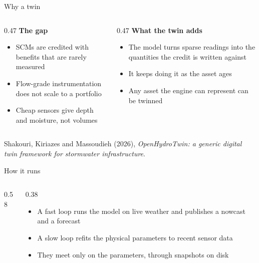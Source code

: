 \documentclass[aspectratio=169, 10pt]{beamer}
\begin{document}
\begin{frame}{Why a twin}
  \begin{columns}[T,onlytextwidth]
    \begin{column}{0.47\textwidth}
      \textbf{The gap}
      \begin{itemize}\setlength\itemsep{4pt}
        \item SCMs are credited with benefits that are rarely measured
        \item Flow-grade instrumentation does not scale to a portfolio
        \item Cheap sensors give depth and moisture, not \alert{volumes}
      \end{itemize}
    \end{column}
    \begin{column}{0.47\textwidth}
      \textbf{What the twin adds}
      \begin{itemize}\setlength\itemsep{4pt}
        \item The model turns sparse readings into the quantities the credit
              is written against
        \item It keeps doing it \alert{as the asset ages}
        \item Any asset the engine can represent can be twinned
      \end{itemize}
    \end{column}
  \end{columns}
  \vspace{0.8em}
  {\tiny\color{ohqgrey} Shakouri, Kiriazes and Massoudieh (2026),
  \emph{OpenHydroTwin: a generic digital twin framework for stormwater
  infrastructure}.}
\end{frame}

\begin{frame}{How it runs}
  \begin{columns}[T,onlytextwidth]
    \begin{column}{0.58\textwidth}
    \end{column}
    \begin{column}{0.38\textwidth}
      \begin{itemize}\setlength\itemsep{6pt}
        \item A \alert{fast loop} runs the model on live weather and publishes
              a nowcast and a forecast
        \item A \alert{slow loop} refits the physical parameters to recent
              sensor data
        \item They meet only on the parameters, through snapshots on disk
      \end{itemize}
    \end{column}
  \end{columns}
\end{frame}
\end{document}
